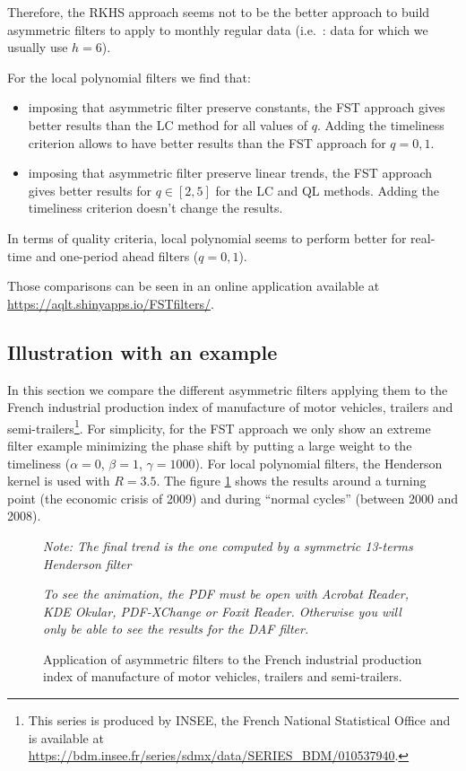 \documentclass[
  12pt,
  ,
  a4paper]{article}
\newcommand\1{\mathds{1}}
\begin{document}
\faArrowCircleRight{} Therefore, the RKHS approach seems not to be the better approach to build asymmetric filters to apply to monthly regular data (i.e.~: data for which we usually use \(h=6\)).

For the local polynomial filters we find that:

\begin{itemize}
\item
  imposing that asymmetric filter preserve constants, the FST approach gives better results than the LC method for all values of \(q\).
  Adding the timeliness criterion allows to have better results than the FST approach for \(q=0,1\).
\item
  imposing that asymmetric filter preserve linear trends, the FST approach gives better results for \(q\in[2,5]\) for the LC and QL methods.
  Adding the timeliness criterion doesn't change the results.
\end{itemize}

\faArrowCircleRight{} In terms of quality criteria, local polynomial seems to perform better for real-time and one-period ahead filters (\(q=0,1\)).

Those comparisons can be seen in an online application available at \url{https://aqlt.shinyapps.io/FSTfilters/}.

\hypertarget{illustration-with-an-example}{%
\subsection{Illustration with an example}\label{illustration-with-an-example}}

In this section we compare the different asymmetric filters applying them to the French industrial production index of manufacture of motor vehicles, trailers and semi-trailers\footnote{This series is produced by INSEE, the French National Statistical Office and is available at \url{https://bdm.insee.fr/series/sdmx/data/SERIES_BDM/010537940}.}.
For simplicity, for the FST approach we only show an extreme filter example minimizing the phase shift by putting a large weight to the timeliness (\(\alpha = 0\), \(\beta = 1\), \(\gamma = 1000\)). For local polynomial filters, the Henderson kernel is used with \(R=3.5\).
The figure \ref{fig:cl2all} shows the results around a turning point (the economic crisis of 2009) and during ``normal cycles'' (between 2000 and 2008).

\begin{figure}[!ht]
\caption{Application of asymmetric filters to the French industrial production index of manufacture of motor vehicles, trailers and semi-trailers.}\label{fig:cl2all}\footnotesize
\emph{Note: The final trend is the one computed by a symmetric 13-terms Henderson filter}

\emph{To see the animation, the PDF must be open with Acrobat Reader, KDE Okular, PDF-XChange or Foxit Reader.
Otherwise you will only be able to see the results for the DAF filter.}
\end{figure}
\end{document}
